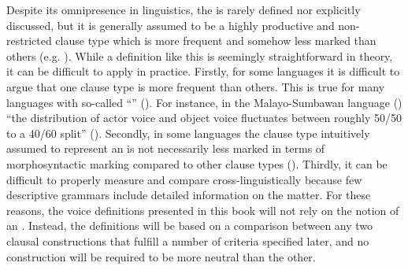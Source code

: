 Despite its omnipresence in linguistics, the  is rarely defined nor explicitly discussed, but it is generally assumed to be a highly productive and non-restricted clause type which is more frequent and somehow less marked than others (e.g. \citealt[19ff.]{comrie:1988}). While a definition like this is seemingly straightforward in theory, it can be difficult to apply in practice. Firstly, for some languages it is difficult to argue that one clause type is more frequent than others. This is true for many languages with so-called “” (\citealt[120ff.]{zuniga:kittila:2019}). For instance, in the Malayo-Sumbawan language  () “the distribution of actor voice and object voice fluctuates between roughly 50/50 to a 40/60 split” (\citealt[257, 311]{davies:2010}). Secondly, in some languages the clause type intuitively assumed to represent an  is not necessarily less marked in terms of morphosyntactic marking compared to other clause types (). Thirdly, it can be difficult to properly measure and compare  cross-linguistically because few descriptive grammars include detailed information on the matter. For these reasons, the voice definitions presented in this book will not rely on the notion of an . Instead, the definitions will be based on a comparison between any two clausal constructions that fulfill a number of criteria specified later, and no construction will be required to be more neutral than the other.

